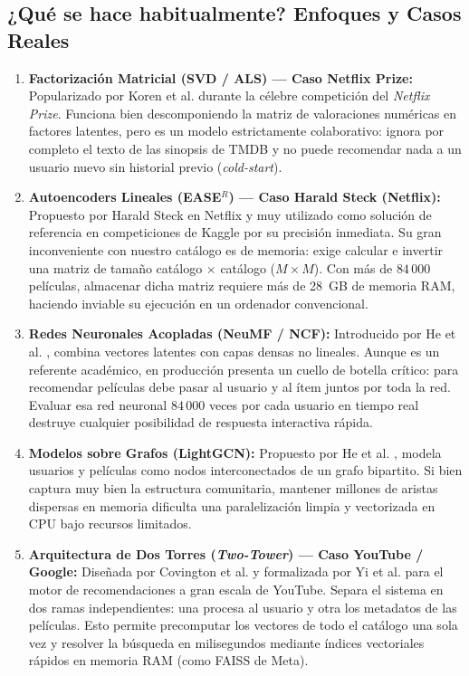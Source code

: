 \documentclass[a4paper,11pt]{article}
\begin{document}
\subsection{¿Qué se hace habitualmente? Enfoques y Casos Reales}
\begin{enumerate}
    \item \textbf{Factorización Matricial (SVD / ALS) --- Caso Netflix Prize:}
    Popularizado por Koren et al. \cite{koren2009} durante la célebre competición del \textit{Netflix Prize}. Funciona bien descomponiendo la matriz de valoraciones numéricas en factores latentes, pero es un modelo estrictamente colaborativo: ignora por completo el texto de las sinopsis de TMDB y no puede recomendar nada a un usuario nuevo sin historial previo (\textit{cold-start}).

    \item \textbf{Autoencoders Lineales (EASE$^R$) --- Caso Harald Steck (Netflix):}
    Propuesto por Harald Steck \cite{steck2019} en Netflix y muy utilizado como solución de referencia en competiciones de Kaggle por su precisión inmediata. Su gran inconveniente con nuestro catálogo es de memoria: exige calcular e invertir una matriz de tamaño catálogo $\times$ catálogo ($M \times M$). Con más de $84\,000$ películas, almacenar dicha matriz requiere más de 28~GB de memoria RAM, haciendo inviable su ejecución en un ordenador convencional.

    \item \textbf{Redes Neuronales Acopladas (NeuMF / NCF):}
    Introducido por He et al. \cite{he2017}, combina vectores latentes con capas densas no lineales. Aunque es un referente académico, en producción presenta un cuello de botella crítico: para recomendar películas debe pasar al usuario y al ítem juntos por toda la red. Evaluar esa red neuronal $84\,000$ veces por cada usuario en tiempo real destruye cualquier posibilidad de respuesta interactiva rápida.

    \item \textbf{Modelos sobre Grafos (LightGCN):}
    Propuesto por He et al. \cite{he2020}, modela usuarios y películas como nodos interconectados de un grafo bipartito. Si bien captura muy bien la estructura comunitaria, mantener millones de aristas dispersas en memoria dificulta una paralelización limpia y vectorizada en CPU bajo recursos limitados.

    \item \textbf{Arquitectura de Dos Torres (\textit{Two-Tower}) --- Caso YouTube / Google:}
    Diseñada por Covington et al. \cite{covington2016} y formalizada por Yi et al. \cite{yi2019} para el motor de recomendaciones a gran escala de YouTube. Separa el sistema en dos ramas independientes: una procesa al usuario y otra los metadatos de las películas. Esto permite precomputar los vectores de todo el catálogo una sola vez y resolver la búsqueda en milisegundos mediante índices vectoriales rápidos en memoria RAM (como FAISS de Meta).


\end{enumerate}
\end{document}
